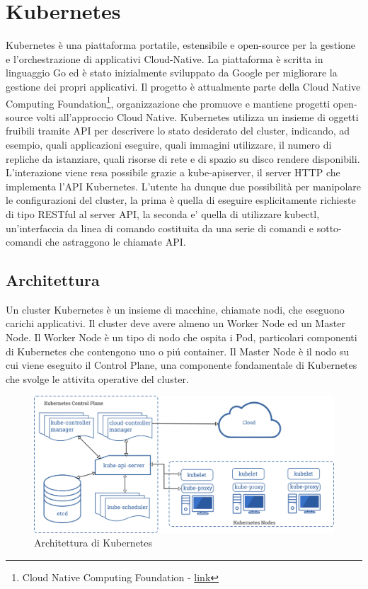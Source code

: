 
\section{Kubernetes}
Kubernetes è una piattaforma portatile, estensibile e open-source per la gestione e l'orchestrazione di applicativi Cloud-Native.
La piattaforma è scritta in linguaggio Go ed è stato inizialmente sviluppato da Google per migliorare la gestione dei propri applicativi. Il progetto è attualmente parte della Cloud Native Computing Foundation\footnote{Cloud Native Computing Foundation - \url{link}}, organizzazione che promuove e mantiene progetti open-source volti all'approccio Cloud Native.
Kubernetes utilizza un insieme di oggetti fruibili tramite API per descrivere lo stato desiderato del cluster, indicando, ad esempio, quali applicazioni eseguire, quali immagini utilizzare, il numero di repliche da istanziare, quali risorse di rete e di spazio su disco rendere disponibili. L'interazione viene resa possibile grazie a kube-apiserver, il server HTTP che implementa l'API Kubernetes. L'utente ha dunque due possibilità per manipolare le configurazioni del cluster, la prima è quella di eseguire esplicitamente richieste di tipo RESTful al server API, la seconda e' quella di utilizzare kubectl, un'interfaccia da linea di comando costituita da una serie di comandi e sotto-comandi che astraggono le chiamate API.
\subsection{Architettura}
Un cluster Kubernetes è un insieme di macchine, chiamate nodi, che eseguono carichi applicativi. Il cluster deve avere almeno un Worker Node ed un Master Node. Il Worker Node è un tipo di nodo che ospita i Pod, particolari componenti di Kubernetes che contengono uno o piú container. Il Master Node è il nodo su cui viene eseguito il Control Plane, una componente fondamentale di Kubernetes che svolge le attivita operative del cluster.

\begin{figure}[H]
 \centering
 \includegraphics[width=1.0\textwidth]{./Figure/Kubernetes_Architettura.png}
 \caption{Architettura di Kubernetes}
 \label{fig:Architettura}
\end{figure}

